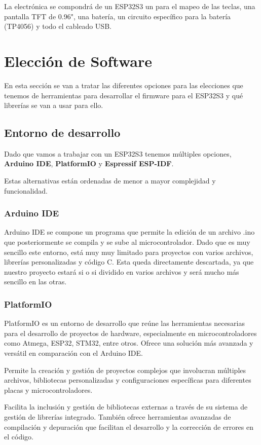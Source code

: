 La electrónica se compondrá de un ESP32S3 un  para el mapeo de las teclas, una pantalla \gls{TFT} de 0.96", una batería, un circuito específico para la batería (TP4056) y todo el cableado USB.
\newpage

\section{Elección de Software}
En esta sección se van a tratar las diferentes opciones para las elecciones que tenemos de herramientas para desarrollar el firmware para el ESP32S3 y qué librerías se van a usar para ello.

\subsection{Entorno de desarrollo}
Dado que vamos a trabajar con un ESP32S3 tenemos múltiples opciones, \textbf{Arduino IDE}, \textbf{PlatformIO} y \textbf{Espressif ESP-IDF}.

Estas alternativas están ordenadas de menor a mayor complejidad y funcionalidad.
\subsubsection{Arduino IDE}
Arduino IDE se compone un programa que permite la edición de un archivo .ino que posteriormente se compila y se sube al microcontrolador. Dado que es muy sencillo este entorno, está muy muy limitado para proyectos con varios archivos, librerías personalizadas y código C. Esta queda directamente descartada, ya que nuestro proyecto estará si o si dividido en varios archivos y será mucho más sencillo en las otras.

\subsubsection{PlatformIO} \label{DiseñoPlatformIO}
PlatformIO es un entorno de desarrollo que reúne las herramientas necesarias para el desarrollo de proyectos de hardware, especialmente en microcontroladores como Atmega, ESP32, STM32, entre otros. Ofrece una solución más avanzada y versátil en comparación con el Arduino IDE.

Permite la creación y gestión de proyectos complejos que involucran múltiples archivos, bibliotecas personalizadas y configuraciones específicas para diferentes placas y microcontroladores.

Facilita la inclusión y gestión de bibliotecas externas a través de su sistema de gestión de librerías integrado. También ofrece herramientas avanzadas de compilación y depuración que facilitan el desarrollo y la corrección de errores en el código.

